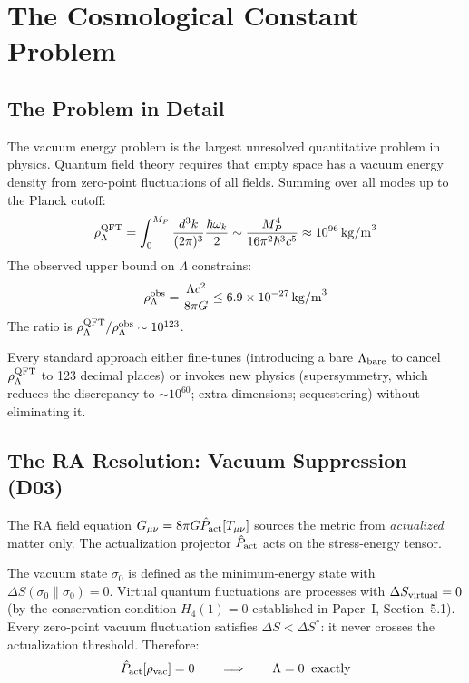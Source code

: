 \documentclass[12pt,a4paper]{article}
\begin{document}
\section{The Cosmological Constant Problem}\label{sec:lambda}

\subsection{The Problem in Detail}

The vacuum energy problem is the largest unresolved quantitative problem in physics.  Quantum field theory requires that empty space has a vacuum energy density from zero-point fluctuations of all fields.  Summing over all modes up to the Planck cutoff:
\begin{equation}
  \rho_\Lambda^{\rm QFT} = \int_0^{M_P}\frac{d^3k}{(2\pi)^3}\frac{\hbar\omega_k}{2} \sim \frac{M_P^4}{16\pi^2\hbar^3c^5} \approx 10^{96}\,\mathrm{kg/m}^3
  \label{eq:rho_vac_QFT}
\end{equation}
The observed upper bound on $\Lambda$ constrains:
\begin{equation}
  \rho_\Lambda^{\rm obs} = \frac{\Lambda c^2}{8\pi G} \leq 6.9\times10^{-27}\,\mathrm{kg/m}^3
  \label{eq:rho_obs}
\end{equation}
The ratio is $\rho_\Lambda^{\rm QFT}/\rho_\Lambda^{\rm obs}\sim10^{123}$.

Every standard approach either fine-tunes (introducing a bare $\Lambda_{\rm bare}$ to cancel $\rho_\Lambda^{\rm QFT}$ to 123 decimal places) or invokes new physics (supersymmetry, which reduces the discrepancy to $\sim10^{60}$; extra dimensions; sequestering) without eliminating it.

\subsection{The RA Resolution: Vacuum Suppression (D03)}

The RA field equation $G_{\mu\nu}=8\pi G\hat{P}_{\mathrm{act}}[T_{\mu\nu}]$ sources the metric from \emph{actualized} matter only.  The actualization projector $\hat{P}_{\mathrm{act}}$ acts on the stress-energy tensor.

The vacuum state $\sigma_0$ is defined as the minimum-energy state with $\Delta S(\sigma_0\|\sigma_0)=0$.  Virtual quantum fluctuations are processes with $\Delta S_{\rm virtual}=0$ (by the conservation condition $H_4(1)=0$ established in Paper~I, Section~5.1).  Every zero-point vacuum fluctuation satisfies $\Delta S<\Delta S^*$: it never crosses the actualization threshold.  Therefore:
\begin{equation}
  \hat{P}_{\mathrm{act}}[\rho_{\rm vac}] = 0 \qquad\Longrightarrow\qquad \Lambda = 0\;\;\text{exactly}
  \label{eq:lambda_zero}
\end{equation}
\end{document}
